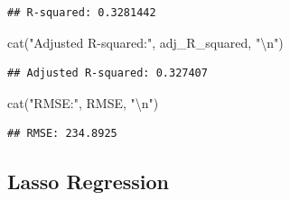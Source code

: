 \documentclass[
]{article}
\newenvironment{Shaded}{\begin{snugshade}}{\end{snugshade}}
\newcommand{\FunctionTok}[1]{\textcolor[rgb]{0.00,0.00,0.00}{#1}}
\newcommand{\NormalTok}[1]{#1}
\newcommand{\SpecialCharTok}[1]{\textcolor[rgb]{0.00,0.00,0.00}{#1}}
\newcommand{\StringTok}[1]{\textcolor[rgb]{0.31,0.60,0.02}{#1}}
\begin{document}
\begin{verbatim}
## R-squared: 0.3281442
\end{verbatim}

\begin{Shaded}
\begin{Highlighting}[]
\FunctionTok{cat}\NormalTok{(}\StringTok{"Adjusted R{-}squared:"}\NormalTok{, adj\_R\_squared, }\StringTok{"}\SpecialCharTok{\textbackslash{}n}\StringTok{"}\NormalTok{)}
\end{Highlighting}
\end{Shaded}

\begin{verbatim}
## Adjusted R-squared: 0.327407
\end{verbatim}

\begin{Shaded}
\begin{Highlighting}[]
\FunctionTok{cat}\NormalTok{(}\StringTok{"RMSE:"}\NormalTok{, RMSE, }\StringTok{"}\SpecialCharTok{\textbackslash{}n}\StringTok{"}\NormalTok{)}
\end{Highlighting}
\end{Shaded}

\begin{verbatim}
## RMSE: 234.8925
\end{verbatim}

\hypertarget{lasso-regression}{%
\subsection{Lasso Regression}\label{lasso-regression}}
\end{document}
